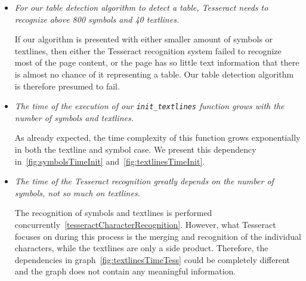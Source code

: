 \begin{itemize}
    \item \emph{For our table detection algorithm to detect a table, Tesseract needs to recognize above 800 symbols and 40 textlines.}
    
    If our algorithm is presented with either smaller amount of symbols or textlines, then either the Tesseract recognition system failed to recognize most of the page content, or the page has so little text information that there is almost no chance of it representing a table. Our table detection algorithm is therefore presumed to fail.

    \item \emph{The time of the execution of our \texttt{init\_textlines} function grows with the number of symbols and textlines.}
    
    As already expected, the time complexity of this function grows exponentially in both the textline and symbol case. We present this dependency in~\cref{fig:symbolsTimeInit} and~\cref{fig:textlinesTimeInit}.

    \item \emph{The time of the Tesseract recognition greatly depends on the number of symbols, not so much on textlines.}
    
    The recognition of symbols and textlines is performed concurrently~\cref{tesseractCharacterRecognition}. However, what Tesseract focuses on during this process is the merging and recognition of the individual characters, while the textlines are only a side product. Therefore, the dependencies in graph~\cref{fig:textlinesTimeTess} could be completely different and the graph does not contain any meaningful information.
    
\end{itemize}

